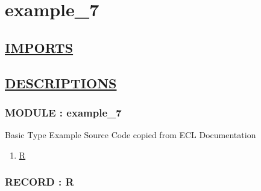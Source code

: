 \chapter*{example\_7}

\section*{\underline{IMPORTS}}

\section*{\underline{DESCRIPTIONS}}
\subsection*{MODULE : example\_7}
\hypertarget{ecldoc:example_7_example_7}{}
Basic Type Example Source Code copied from ECL Documentation \\
\begin{enumerate}
\item \hyperlink{ecldoc:example_7_example_7.r}{R}
\end{enumerate}
\subsection*{RECORD : R}
\hypertarget{ecldoc:example_7_example_7.r}{}

